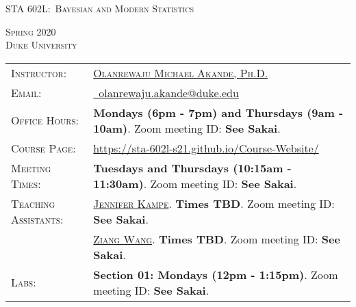 \documentclass[11pt, a4paper]{article}
\begin{document}
\renewcommand{\arraystretch}{1.5}	


\begin{center}
{\Large \textsc{STA 602L:\ Bayesian and Modern Statistics}}
\end{center}


\begin{center}
	\textsc{Spring 2020} \\
	\textsc{Duke University} \\
\end{center}



\begin{center}
	\begin{minipage}[t]{.95\textwidth}
		\begin{tabular}{@{}L{3cm}L{12.5cm}}
			\toprule[0.065cm]
			\textsc{Instructor:} & \href{https://akandelanre.github.io.}{\textsc{Olanrewaju Michael Akande, Ph.D.}} \\
			\textsc{Email:} &\href{mailto:olanrewaju.akande@duke.edu}{\Envelope ~olanrewaju.akande@duke.edu} \\
			\textsc{Office Hours:} & \textbf{Mondays (6pm - 7pm) and Thursdays (9am - 10am)}. \newline Zoom meeting ID: \textbf{See Sakai}. \\
			\textsc{Course Page:} & \href{https://sta-602l-s21.github.io/Course-Website/}{https://sta-602l-s21.github.io/Course-Website/} \\
			\textsc{Meeting Times:}  & \textbf{Tuesdays and Thursdays (10:15am - 11:30am)}. \newline Zoom meeting ID: \textbf{See Sakai}. \\
			\textsc{Teaching Assistants:} & \href{https://scholars.duke.edu/person/jennifer.kampe}{\textsc{Jennifer Kampe}}. 
			\newline \textbf{Times TBD}. \newline Zoom meeting ID: \textbf{See Sakai}.  \\
			&\href{https://scholars.duke.edu/person/ziang.wang}{\textsc{Ziang Wang}}. 
			\newline \textbf{Times TBD}. \newline Zoom meeting ID: \textbf{See Sakai}. \\
			\textsc{Labs:} & \textbf{Section 01: Mondays (12pm - 1:15pm)}. 
			\newline Zoom meeting ID: \textbf{See Sakai}.  \\

\end{tabular}
\end{minipage}
\end{center}
\end{document}
